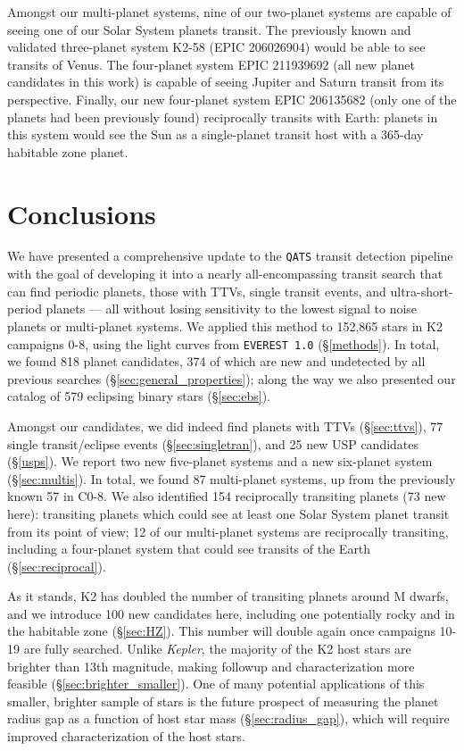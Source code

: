 \documentclass[twocolumn]{aastex62}
\newcommand{\project}[1]{\textsl{#1}}
\newcommand{\pipeline}[1]{\texttt{#1}}
\newcommand{\numstars}{152,865}
\newcommand{\nplanet}{818}
\newcommand{\nnewplanet}{374}
\newcommand{\singletrantot}{77}
\newcommand{\nebs}{579}
\newcommand{\nmultis}{87}
\newcommand{\nothermultis}{57}
\newcommand{\nmdwarfcands}{100}
\newcommand{\nnewusp}{25}
\begin{document}
Amongst our multi-planet systems, nine of our two-planet systems are
capable of seeing one of our Solar System planets transit. The
previously known and validated three-planet system K2-58 (EPIC
206026904) would be able to see transits of Venus. The four-planet
system EPIC 211939692 (all new planet candidates in this work) is
capable of seeing Jupiter and Saturn transit from its
perspective. Finally, our new four-planet system EPIC 206135682 (only
one of the planets had been previously found) reciprocally transits
with Earth: planets in this system would see the Sun as a
single-planet transit host with a 365-day habitable zone planet.


\section{Conclusions} \label{conclusions}

We have presented a comprehensive update to the \cite{car13}
\pipeline{QATS} transit detection pipeline with the goal of developing
it into a nearly all-encompassing transit search that can find
periodic planets, those with TTVs, single transit events, and
ultra-short-period planets --- all without losing sensitivity to the
lowest signal to noise planets or multi-planet systems. We applied
this method to \numstars{} stars in K2 campaigns 0-8, using the light
curves from \pipeline{EVEREST 1.0} (\S\ref{methods}). In total, we
found \nplanet{} planet candidates, \nnewplanet{} of which are new and
undetected by all previous searches (\S\ref{sec:general_properties});
along the way we also presented our catalog of \nebs{} eclipsing
binary stars (\S\ref{sec:ebs}).

Amongst our candidates, we did indeed find planets with TTVs
(\S\ref{sec:ttvs}), \singletrantot{} single transit/eclipse events
(\S\ref{sec:singletran}), and \nnewusp{} new USP candidates
(\S\ref{usps}).  We report two new five-planet systems and a new
six-planet system (\S\ref{sec:multis}). In total, we found \nmultis{}
multi-planet systems, up from the previously known \nothermultis{} in
C0-8. We also identified 154 reciprocally transiting planets (73 new
here): transiting planets which could see at least one Solar System
planet transit from its point of view; 12 of our multi-planet systems
are reciprocally transiting, including a four-planet system that could
see transits of the Earth (\S\ref{sec:reciprocal}).

As it stands, K2 has doubled the number of transiting planets around M
dwarfs, and we introduce \nmdwarfcands{} new candidates here,
including one potentially rocky and in the habitable zone
(\S\ref{sec:HZ}). This number will double again once campaigns 10-19
are fully searched. Unlike \project{Kepler}, the majority of the K2
host stars are brighter than 13th magnitude, making followup and
characterization more feasible (\S\ref{sec:brighter_smaller}). One of
many potential applications of this smaller, brighter sample of stars
is the future prospect of measuring the planet radius gap as a
function of host star mass (\S\ref{sec:radius_gap}), which will
require improved characterization of the host stars.
\end{document}
